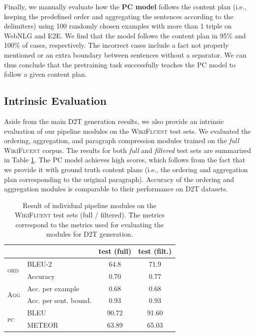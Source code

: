 Finally, we manually evaluate how the \textbf{PC model} follows the content plan (i.e., keeping the predefined order and aggregating the sentences according to the delimiters) using 100 randomly chosen examples with more than 1 triple on WebNLG and E2E. We find that the model follows the content plan in 95\% and 100\% of cases, respectively. The incorrect cases include a fact not properly mentioned or an extra boundary between sentences without a separator. We can thus conclude that the pretraining task successfully teaches the PC model to follow a given content plan.


\subsection{Intrinsic Evaluation}
\label{sec:wikifluent_test}
Aside from the main D2T generation results, we also provide an intrinsic evaluation of our pipeline modules on the \mbox{\textsc{WikiFluent}} test sets. We evaluated the ordering, aggregation, and paragraph compression modules trained on the \textit{full} \textsc{WikiFluent} corpus. The results for both \textit{full} and \textit{filtered} test sets are summarized in Table \ref{tab:wikifluent_test}. The PC model achieves high scores, which follows from the fact that we provide it with ground truth content plans (i.e., the ordering and aggregation plan corresponding to the original paragraph). Accuracy of the ordering and aggregation modules is comparable to their performance on D2T datasets.

\begin{table}[t]
    \centering\small
    \begin{tabular}{ll cc} \toprule
                                          &                       & \textbf{test (full)} & \textbf{test (filt.)} \\\midrule
        \multirow{2}{*}{\textsc{ord}}     & BLEU-2                & 64.8                 & 71.9                  \\
                                          & Accuracy              & 0.70                 & 0.77                  \\ \midrule
        \multirow{2}{*}{\textsc{Agg}}     & Acc. per example      & 0.68                 & 0.68                  \\
                                          & Acc. per sent. bound. & 0.93                 & 0.93                  \\ \midrule
        \multirow{2}{*}{\textsc{\ac{pc}}} & BLEU                  & 90.72                & 91.60                 \\
                                          & METEOR                & 63.89                & 65.03                 \\ \bottomrule
    \end{tabular}
    \caption{Result of individual pipeline modules on the \textsc{WikiFluent} test sets (full / filtered). The metrics correspond to the metrics used for evaluating the modules for D2T generation.}
    \label{tab:wikifluent_test}
\end{table}
